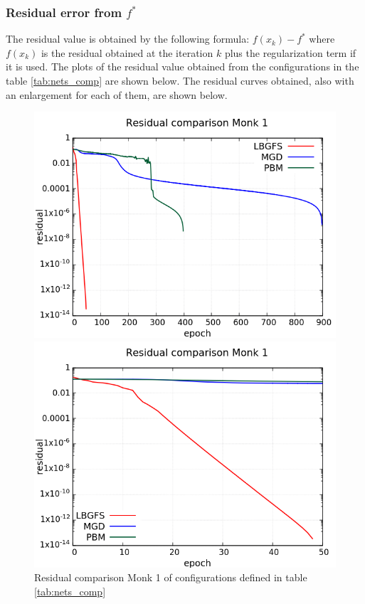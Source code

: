 \subsubsection{Residual error from $f^*$}
The residual value is obtained by the following formula: $ f(x_k) - f^*$ where  $f(x_{k})$ is the residual obtained at the iteration $k$ plus the  regularization term if it is used. The plots of the residual value obtained from the configurations in the table \ref{tab:nets_comp} are shown below. The residual curves obtained, also with an enlargement for each of them, are shown below.

\begin{figure}[H]
	\centering
	\begin{minipage}[t]{0.5\linewidth}
		\includegraphics[width=\linewidth]{data/Comparison/Monk1/Monk1_R_Comparison_log_standard.png}
	\end{minipage}%
	\begin{minipage}[t]{0.5\linewidth}
		\includegraphics[width=\linewidth]{data/Comparison/Monk1/Monk1_R_Comparison_log_zoom.png}
	\end{minipage}
	\caption{Residual comparison Monk 1 of configurations defined in table \ref{tab:nets_comp}}
	\label{R-Monk1}
\end{figure}
